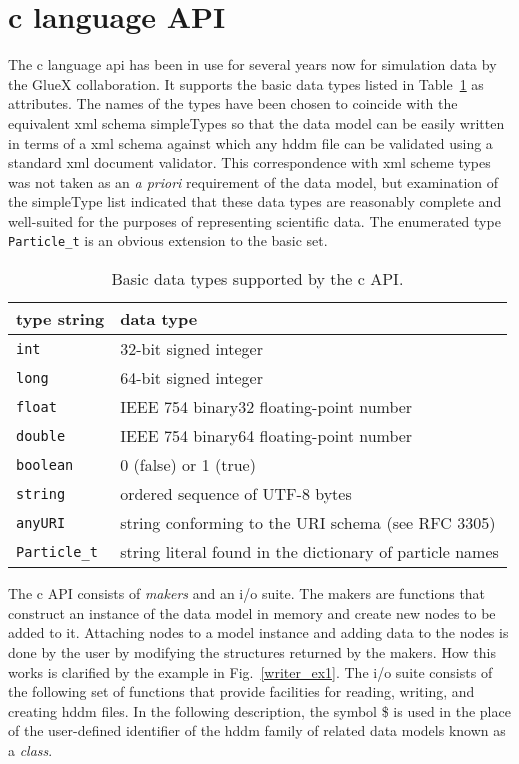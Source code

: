 \documentclass{revtex4}
\begin{document}
\section{c language API}
The c language api has been in use for several years now for simulation data by
the GlueX collaboration.  It supports the basic data types listed in
Table~\ref{attribs} as attributes.
The names of the types have been chosen to coincide with the equivalent xml
schema simpleTypes so that the data model can be easily written in terms of
a xml schema against which any hddm file can be validated using a standard
xml document validator.  This correspondence with xml scheme types was not
taken as an {\em a priori} requirement of the data model, but examination of
the simpleType list indicated that these data types are reasonably complete
and well-suited for the purposes of representing scientific data.  The
enumerated type \texttt{Particle\_t} is an obvious extension to the basic set.

\begin{table}
\caption{\label{attribs}
Basic data types supported by the c API.}
\setlength{\tabcolsep}{12pt}
\begin{center}
\begin{tabular}{ll}
\hline\hline
type string & data type \\
\hline 
\texttt{int} & 32-bit signed integer\\
\texttt{long} & 64-bit signed integer\\
\texttt{float} & IEEE 754 binary32 floating-point number\\
\texttt{double} & IEEE 754 binary64 floating-point number\\
\texttt{boolean} & 0 (false) or 1 (true)\\
\texttt{string} & ordered sequence of UTF-8 bytes\\
\texttt{anyURI} & string conforming to the URI schema (see RFC 3305)\\
\texttt{Particle\_t} & string literal found in the dictionary of particle names\\
\hline\hline
\end{tabular}
\end{center}
\end{table}

The c API consists of {\em makers} and an i/o suite.  The makers
are functions that construct an instance of the data model in memory and
create new nodes to be added to it.  Attaching nodes to a model instance
and adding data to the nodes is done by the user by modifying the
structures returned by the makers.  How this works is clarified by the
example in Fig.~\ref{writer_ex1}.  The i/o suite consists of the following set
of functions that provide facilities for reading, writing, and creating
hddm files.  In the following description, the symbol \$ is used in the
place of the user-defined identifier of the hddm family of related data
models known as a {\em class}.
\end{document}
